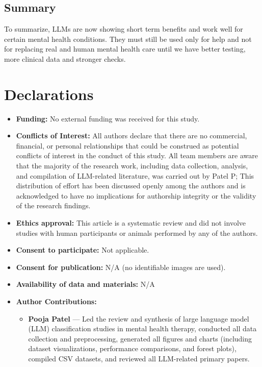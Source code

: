 \documentclass[sn-basic,authoryear]{sn-jnl}
\begin{document}
\subsection{Summary}
To summarize, LLMs are now showing short term benefits and work well for certain mental health conditions. They must still be used only for help and not for replacing real and human mental health care until we have better testing, more clinical data and stronger checks.



\section*{Declarations}
\begin{itemize}
    \item \textbf{Funding:} No external funding was received for this study.
    \item \textbf{Conflicts of Interest:} All authors declare that there are no commercial, financial, or personal relationships that could be construed as potential conflicts of interest in the conduct of this study. All team members are aware that the majority of the research work, including data collection, analysis, and compilation of LLM-related literature, was carried out by Patel P; This distribution of effort has been discussed openly among the authors and is acknowledged to have no implications for authorship integrity or the validity of the research findings.
    \item \textbf{Ethics approval:} This article is a systematic review and did not involve studies with human participants or animals performed by any of the authors.
    \item \textbf{Consent to participate:} Not applicable.
    \item \textbf{Consent for publication:} N/A (no identifiable images are used).
    \item \textbf{Availability of data and materials:} N/A
    \item \textbf{Author Contributions:} \begin{itemize}
    \item \textbf{Pooja Patel} --- Led the review and synthesis of large language model (LLM) classification studies in mental health therapy, conducted all data collection and preprocessing, generated all figures and charts (including dataset visualizations, performance comparisons, and forest plots), compiled CSV datasets, and reviewed all LLM-related primary papers.
    

\end{itemize}
\end{itemize}
\end{document}
